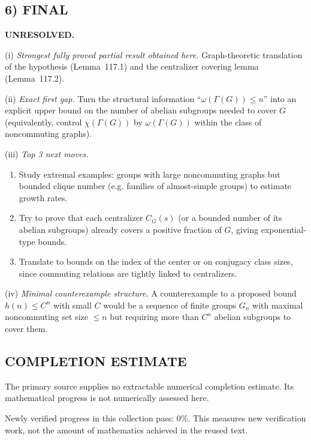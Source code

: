 \subsection*{6) FINAL}
\textbf{UNRESOLVED.}

(i) \emph{Strongest fully proved partial result obtained here.}
Graph-theoretic translation of the hypothesis (Lemma~117.1) and the centralizer covering lemma (Lemma~117.2).

(ii) \emph{Exact first gap.}
Turn the structural information ``$\omega(\Gamma(G))\le n$'' into an explicit upper bound on the number of abelian subgroups needed to cover $G$ (equivalently, control $\chi(\Gamma(G))$ by $\omega(\Gamma(G))$ within the class of noncommuting graphs).

(iii) \emph{Top 3 next moves.}
\begin{enumerate}
\item Study extremal examples: groups with large noncommuting graphs but bounded clique number (e.g. families of almost-simple groups) to estimate growth rates.
\item Try to prove that each centralizer $C_G(s)$ (or a bounded number of its abelian subgroups) already covers a positive fraction of $G$, giving exponential-type bounds.
\item Translate to bounds on the index of the center or on conjugacy class sizes, since commuting relations are tightly linked to centralizers.
\end{enumerate}

(iv) \emph{Minimal counterexample structure.}
A counterexample to a proposed bound $h(n)\le C^n$ with small $C$ would be a sequence of finite groups $G_n$ with maximal noncommuting set size $\le n$ but requiring more than $C^n$ abelian subgroups to cover them.




\subsection*{COMPLETION ESTIMATE}
The primary source supplies no extractable numerical completion estimate. Its mathematical progress is not numerically assessed here.

Newly verified progress in this collection pass: $0\%$. This measures new verification work, not the amount of mathematics achieved in the reused text.
